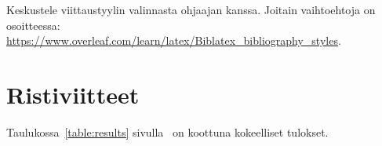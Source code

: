 Keskustele viittaustyylin valinnasta ohjaajan kanssa. Joitain vaihtoehtoja on osoitteessa:\\ 
\url{https://www.overleaf.com/learn/latex/Biblatex_bibliography_styles}.

\section{Ristiviitteet}

Taulukossa~\ref{table:results} sivulla~\pageref{table:results} on koottuna kokeelliset tulokset.


 

